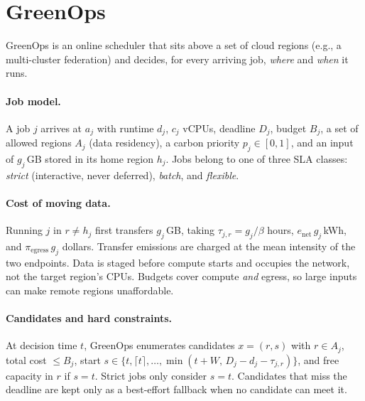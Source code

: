 \section{GreenOps}
\label{sec:design}

GreenOps is an online scheduler that sits above a set of cloud regions
(e.g., a multi-cluster federation) and decides, for every arriving job,
\emph{where} and \emph{when} it runs.

\paragraph{Job model.}
A job $j$ arrives at $a_j$ with runtime $d_j$, $c_j$ vCPUs, deadline $D_j$,
budget $B_j$, a set of allowed regions $A_j$ (data residency), a carbon
priority $p_j\in[0,1]$, and an input of $g_j$\,GB stored in its home
region $h_j$. Jobs belong to one of three SLA classes: \emph{strict}
(interactive, never deferred), \emph{batch}, and \emph{flexible}.

\paragraph{Cost of moving data.}
Running $j$ in $r\neq h_j$ first transfers $g_j$\,GB, taking
$\tau_{j,r}=g_j/\beta$ hours, $e_{\text{net}}\,g_j$\,kWh, and
$\pi_{\text{egress}}\,g_j$ dollars. Transfer emissions are charged at the
mean intensity of the two endpoints. Data is staged before compute
starts and occupies the network, not the target region's CPUs. Budgets
cover compute \emph{and} egress, so large inputs can make remote regions
unaffordable.

\paragraph{Candidates and hard constraints.}
At decision time $t$, GreenOps enumerates candidates $x=(r,s)$ with
$r\in A_j$, total cost $\le B_j$, start
$s\in\{t,\lceil t\rceil,\dots,\min(t{+}W,\,D_j{-}d_j{-}\tau_{j,r})\}$, and
free capacity in $r$ if $s=t$. Strict jobs only consider $s=t$.
Candidates that miss the deadline are kept only as a best-effort
fallback when no candidate can meet it.

